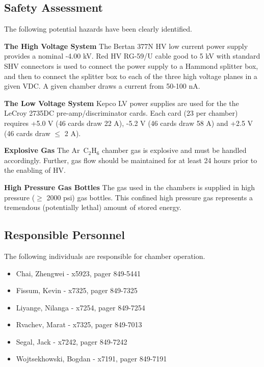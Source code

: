 \documentclass[12pt]{article}
\begin{document}
\subsection{Safety Assessment}
The following potential hazards have been clearly identified.
\begin{description}
\item {\bf The High Voltage System}
The Bertan 377N HV low current power supply provides a nominal
-4.00 kV.  Red HV RG-59/U cable good to 5 kV with standard SHV
connectors is used to connect the power supply to a Hammond splitter
box, and then to connect the splitter box to each of the three high
voltage planes in a given VDC.  A given chamber draws a current
from  50-100 nA.
\item {\bf The Low Voltage System}
Kepco LV power supplies are used for the the LeCroy 2735DC
pre-amp/discriminator cards.  Each card (23 per chamber) requires
+5.0 V (46 cards draw 22 A), -5.2 V (46 cards draw 58 A) and +2.5 V
(46 cards draw $\leq$ 2 A).
\item{\bf Explosive Gas} The Ar~C$_2$H$_6$ chamber gas is explosive
and must be handled accordingly.  Further, gas flow should be maintained
for at least 24 hours prior to the enabling of HV.
\item{\bf High Pressure Gas Bottles} The gas used in the chambers
is supplied in high pressure ($\ge$ 2000 psi) gas bottles. This
confined high pressure gas represents a tremendous (potentially lethal)
amount of stored energy.
\end{description}

\subsection{Responsible Personnel} 
\label{people}
The following individuals are responsible for chamber operation. 
\begin{itemize} 
\item[~]Chai, Zhengwei - x5923, pager 849-5441 
\item[~]Fissum, Kevin - x7325, pager 849-7325 
\item[~]Liyange, Nilanga - x7254, pager 849-7254 
\item[~]Rvachev, Marat - x7325, pager 849-7013 
\item[~]Segal, Jack - x7242, pager 849-7242 
\item[~]Wojtsekhowski, Bogdan - x7191, pager 849-7191 
\end{itemize} 
\end{document}
